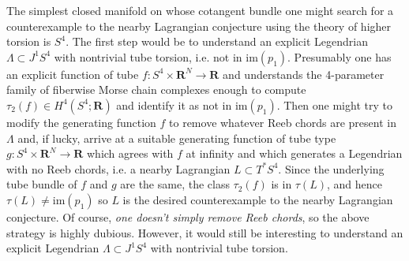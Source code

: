 \documentclass{amsart}
\def\bR{\mathbf{R}}
\theoremstyle{definition}
\theoremstyle{remark}
\newtheorem{inductive lemma}[theorem]{Inductive Lemma}
\begin{document}
The simplest closed manifold on whose cotangent bundle one might search for a counterexample to the nearby Lagrangian conjecture using the theory of higher torsion is $S^4$. The first step would be to understand an explicit Legendrian $\Lambda \subset J^1S^4$ with nontrivial tube torsion, i.e. not in $\text{im}(p_1)$. Presumably one has an explicit function of tube $f:S^4 \times \bR^N \to \bR$ and understands the 4-parameter family of fiberwise Morse chain complexes enough to compute $\tau_{2}(f)\in H^4(S^4;\bR)$ and identify it as not in $\text{im}(p_1)$.  Then one  might try to modify the generating function $f$ to remove whatever Reeb chords are present in $\Lambda$ and, if lucky, arrive at a suitable generating function of tube type $g:S^4 \times \bR^N \to \bR$ which agrees with $f$ at infinity and which generates a Legendrian with no Reeb chords, i.e. a nearby Lagrangian $L \subset T^*S^4$.  Since the underlying tube bundle of $f$ and $g$ are the same, the class $\tau_2(f)$ is in $\tau(L)$, and hence $\tau(L) \neq \text{im}(p_1)$ so $L$ is the desired counterexample to the nearby Lagrangian conjecture. Of course, {\em one doesn't simply remove Reeb chords}, so the above strategy is highly dubious. However, it would still be interesting to understand an explicit Legendrian $\Lambda \subset J^1S^4$ with nontrivial tube torsion.


\end{document}
